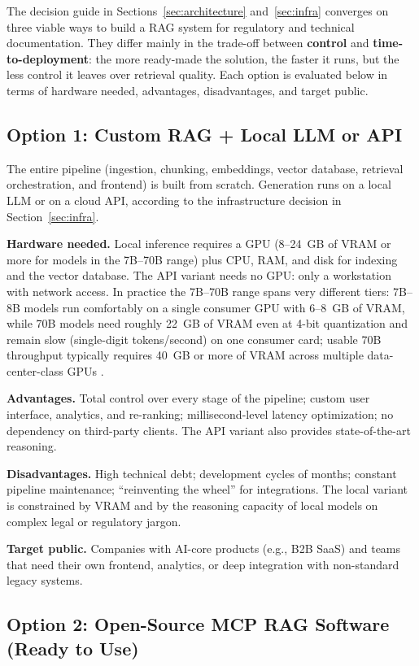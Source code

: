 \documentclass[11pt,a4paper]{article}
\begin{document}
The decision guide in Sections~\ref{sec:architecture} and~\ref{sec:infra}
converges on three viable ways to build a RAG system for regulatory and
technical documentation. They differ mainly in the trade-off between
\textbf{control} and \textbf{time-to-deployment}: the more ready-made the
solution, the faster it runs, but the less control it leaves over retrieval
quality. Each option is evaluated below in terms of hardware needed,
advantages, disadvantages, and target public.

\subsection{Option 1: Custom RAG + Local LLM or API}

The entire pipeline (ingestion, chunking, embeddings, vector database,
retrieval orchestration, and frontend) is built from scratch. Generation runs
on a local LLM or on a cloud API, according to the infrastructure decision in
Section~\ref{sec:infra}.

\textbf{Hardware needed.} Local inference requires a GPU (8--24~GB of VRAM or
more for models in the 7B--70B range) plus CPU, RAM, and disk for indexing
and the vector database. The API variant needs no GPU: only a workstation
with network access. In practice the 7B--70B range spans very different
tiers: 7B--8B models run comfortably on a single consumer GPU with
6--8~GB of VRAM, while 70B models need roughly 22~GB of VRAM even at
4-bit quantization and remain slow (single-digit tokens/second) on one
consumer card; usable 70B throughput typically requires 40~GB or more of
VRAM across multiple data-center-class GPUs \cite{localbench}.

\textbf{Advantages.} Total control over every stage of the pipeline; custom
user interface, analytics, and re-ranking; millisecond-level latency
optimization; no dependency on third-party clients. The API variant also
provides state-of-the-art reasoning.

\textbf{Disadvantages.} High technical debt; development cycles of months;
constant pipeline maintenance; ``reinventing the wheel'' for integrations.
The local variant is constrained by VRAM and by the reasoning capacity of
local models on complex legal or regulatory jargon.

\textbf{Target public.} Companies with AI-core products (e.g., B2B SaaS) and
teams that need their own frontend, analytics, or deep integration with
non-standard legacy systems.

\subsection{Option 2: Open-Source MCP RAG Software (Ready to Use)}
\end{document}
